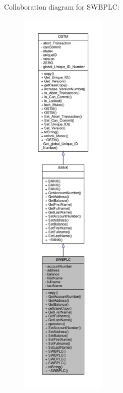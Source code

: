Collaboration diagram for S\+W\+B\+P\+LC\+:
\nopagebreak
\begin{figure}[H]
\begin{center}
\leavevmode
\includegraphics[height=550pt]{class_s_w_b_p_l_c__coll__graph}
\end{center}
\end{figure}
